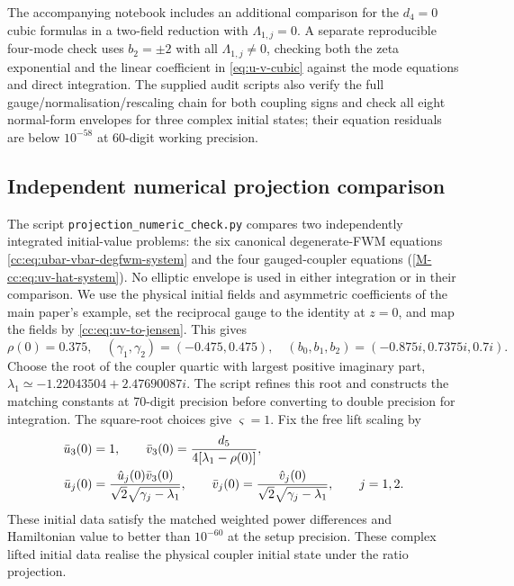 \documentclass[11pt,a4paper]{article}
\newcommand{\externaleqref}[1]{\textup{(\ref*{#1})}}
\begin{document}
The accompanying notebook includes an additional comparison for the $d_4=0$ cubic formulas in a two-field reduction with $\Lambda_{1,j}=0$.
A separate reproducible four-mode check uses $b_2=\pm2$ with all $\Lambda_{1,j}\ne0$, checking both the zeta exponential and the linear coefficient in \eqref{eq:u-v-cubic} against the mode equations and direct integration.
The supplied audit scripts also verify the full gauge/normalisation/rescaling chain for both coupling signs and check all eight normal-form envelopes for three complex initial states; their equation residuals are below $10^{-58}$ at 60-digit working precision.

\subsection{Independent numerical projection comparison}\label{supp:subsec:projection-numeric}
The script \nolinkurl{projection_numeric_check.py} compares two independently integrated initial-value problems: the six canonical degenerate-FWM equations \eqref{cc:eq:ubar-vbar-degfwm-system} and the four gauged-coupler equations \externaleqref{M-cc:eq:uv-hat-system}.
No elliptic envelope is used in either integration or in their comparison.
We use the physical initial fields and asymmetric coefficients of the main paper's example, set the reciprocal gauge to the identity at $z=0$, and map the fields by \eqref{cc:eq:uv-to-jensen}.
This gives
\begin{equation}
\rho(0)=0.375,\quad (\gamma_1,\gamma_2)=(-0.475,0.475),\quad
(b_0,b_1,b_2)=(-0.875i,0.7375i,0.7i).
\end{equation}
Choose the root of the coupler quartic with largest positive imaginary part,
$\lambda_1\simeq-1.22043504+2.47690087i$.
The script refines this root and constructs the matching constants at 70-digit precision before converting to double precision for integration.
The square-root choices give $\varsigma=1$.
Fix the free lift scaling by
\begin{align}
\bar u_3(0)&=1,\qquad \bar v_3(0)=\frac{d_5}{4[\lambda_1-\rho(0)]},\notag\\
\bar u_j(0)&=\frac{\hat u_j(0)\bar v_3(0)}{\sqrt2\sqrt{\gamma_j-\lambda_1}},\qquad
\bar v_j(0)=\frac{\hat v_j(0)}{\sqrt2\sqrt{\gamma_j-\lambda_1}},\qquad j=1,2.
\end{align}
These initial data satisfy the matched weighted power differences and Hamiltonian value to better than $10^{-60}$ at the setup precision.
These complex lifted initial data realise the physical coupler initial state under the ratio projection.
\end{document}
